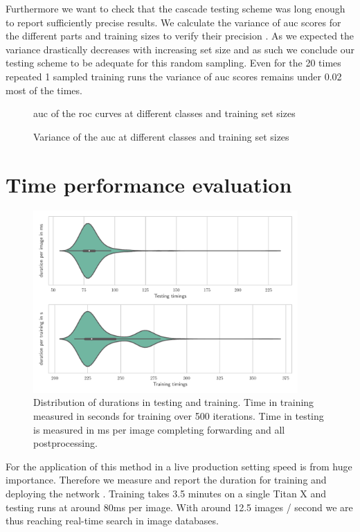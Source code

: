 Furthermore we want to check that the cascade testing scheme was long enough to report sufficiently precise results. We calculate the variance of \gls{auc} scores for the different parts and training sizes to verify their precision . As we expected the variance drastically decreases with increasing set size and as such we conclude our testing scheme to be adequate for this random sampling. Even for the 20 times repeated 1 sampled training runs the variance of \gls{auc} scores remains under 0.02 most of the times.
\begin{figure}[p!h]
    \centering
    
	\caption{\gls{auc} of the \gls{roc} curves at different classes and training set sizes}
    \label{fig:auc_heatmap}
\end{figure}
\begin{figure}[p!h]
    \centering
    
	\caption{Variance of the \gls{auc} at different classes and training set sizes}
    \label{fig:auc_var_heatmap}
\end{figure}

\section{Time performance evaluation}
\label{sec:results:time}
\begin{figure}[h!]
  \centering
  \includegraphics[width=0.9\textwidth]{figures/timings_fig}
  \caption{Distribution of durations in testing and training. Time in training measured in seconds for training over 500 iterations. Time in testing is measured in ms per image completing forwarding and all postprocessing.}
  \label{fig:timings}
\end{figure}
For the application of this method in a live production setting speed is from huge importance. Therefore we measure and report the duration for training and deploying the network . Training takes 3.5 minutes on a single Titan X and testing runs at around 80ms per image. With around 12.5 images / second we are thus reaching real-time search in image databases.
